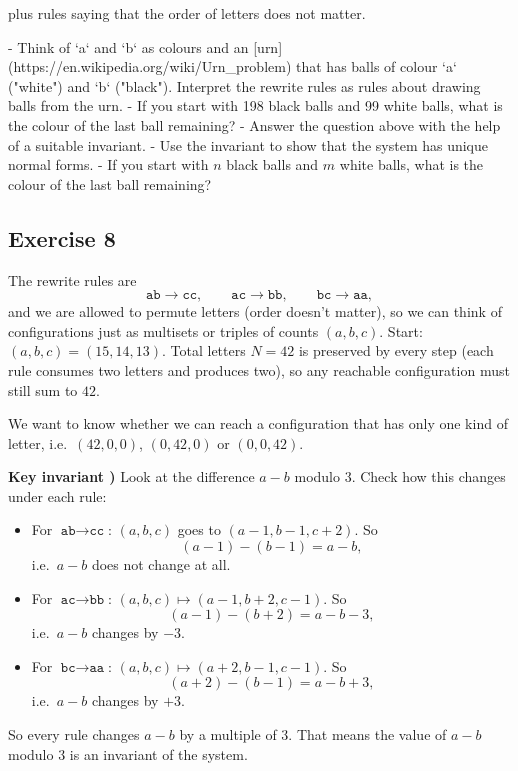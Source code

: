 \documentclass[12pt]{article}
\begin{document}
plus rules saying that the order of letters does not matter. 

- Think of `a` and `b` as colours and an [urn](https://en.wikipedia.org/wiki/Urn_problem) that has balls of colour `a` ("white") and `b` ("black"). Interpret the rewrite rules as rules about drawing balls from the urn.
- If you start with 198 black balls and 99 white balls, what is the colour of the last ball remaining? 
- Answer the question above with the help of a suitable invariant.
- Use the invariant to show that the system has unique normal forms.
- If you start with $n$ black balls and $m$ white balls, what is the colour of the last ball remaining?

\subsection*{Exercise 8}

The rewrite rules are
\[
\texttt{ab}\to\texttt{cc},\qquad
\texttt{ac}\to\texttt{bb},\qquad
\texttt{bc}\to\texttt{aa},
\]
and we are allowed to permute letters (order doesn't matter), so we can think of configurations just as multisets or triples of counts \((a,b,c)\).  
Start: \((a,b,c)=(15,14,13)\). Total letters \(N=42\) is preserved by every step (each rule consumes two letters and produces two), so any reachable configuration must still sum to \(42\).

We want to know whether we can reach a configuration that has only one kind of letter, i.e.\ \((42,0,0)\), \((0,42,0)\) or \((0,0,42)\).

\bigskip

\textbf{Key invariant )}  
Look at the difference \(a-b\) modulo \(3\). Check how this changes under each rule:

\begin{itemize}
  \item For \(\texttt{ab}\to\texttt{cc}\): \((a,b,c)\) goes to \((a-1,b-1,c+2)\). So
  \[
  (a-1)-(b-1)=a-b,
  \]
  i.e.\ \(a-b\) does not change at all.
  \item For \(\texttt{ac}\to\texttt{bb}\): \((a,b,c)\mapsto(a-1,b+2,c-1)\). So
  \[
  (a-1)-(b+2)=a-b-3,
  \]
  i.e.\ \(a-b\) changes by \(-3\).
  \item For \(\texttt{bc}\to\texttt{aa}\): \((a,b,c)\mapsto(a+2,b-1,c-1)\). So
  \[
  (a+2)-(b-1)=a-b+3,
  \]
  i.e.\ \(a-b\) changes by \(+3\).
\end{itemize}

So every rule changes \(a-b\) by a multiple of \(3\). That means the value of \(a-b\) modulo \(3\) is an invariant of the system.
\end{document}
